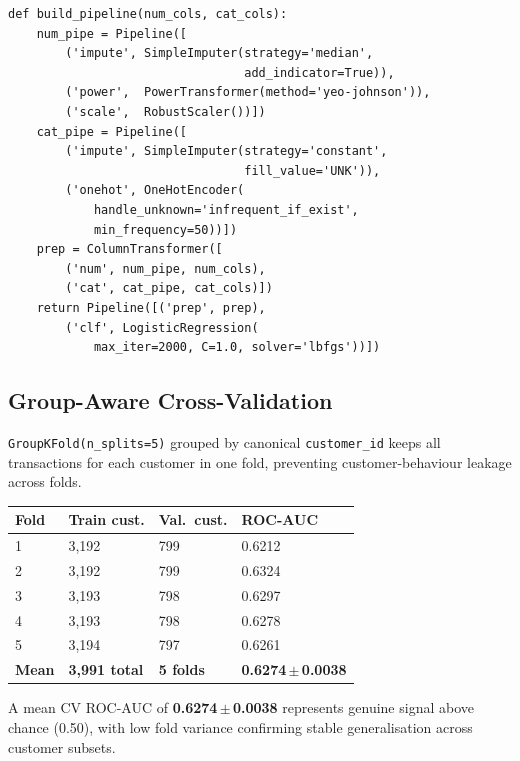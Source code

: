 \documentclass[10pt,a4paper]{article}
\begin{document}
\begin{lstlisting}[caption={End-to-end pipeline.}]
def build_pipeline(num_cols, cat_cols):
    num_pipe = Pipeline([
        ('impute', SimpleImputer(strategy='median',
                                 add_indicator=True)),
        ('power',  PowerTransformer(method='yeo-johnson')),
        ('scale',  RobustScaler())])
    cat_pipe = Pipeline([
        ('impute', SimpleImputer(strategy='constant',
                                 fill_value='UNK')),
        ('onehot', OneHotEncoder(
            handle_unknown='infrequent_if_exist',
            min_frequency=50))])
    prep = ColumnTransformer([
        ('num', num_pipe, num_cols),
        ('cat', cat_pipe, cat_cols)])
    return Pipeline([('prep', prep),
        ('clf', LogisticRegression(
            max_iter=2000, C=1.0, solver='lbfgs'))])
\end{lstlisting}

\subsection*{Group-Aware Cross-Validation}

\texttt{GroupKFold(n\_splits=5)} grouped by canonical
\texttt{customer\_id} keeps all transactions for each customer in
one fold, preventing customer-behaviour leakage across folds.

\vspace{2pt}
{\fontsize{7.5}{9}\selectfont
\setlength{\tabcolsep}{3pt}
\begin{tabularx}{0.6\textwidth}{@{}C{1.0cm} C{3.0cm} C{3.0cm} C{2.5cm}@{}}
\toprule
\textbf{Fold} & \textbf{Train cust.} & \textbf{Val.\ cust.} &
\textbf{ROC-AUC} \\
 & 3,192 & 799 & 0.6212 \\
2 & 3,192 & 799 & 0.6324 \\
3 & 3,193 & 798 & 0.6297 \\
4 & 3,193 & 798 & 0.6278 \\
5 & 3,194 & 797 & 0.6261 \\
\midrule
\textbf{Mean} & \textbf{3,991 total} & \textbf{5 folds} &
  \textbf{0.6274\,$\pm$\,0.0038} \\
\bottomrule
\end{tabularx}
}

\vspace{3pt}
A mean CV ROC-AUC of \textbf{0.6274\,$\pm$\,0.0038} represents genuine
signal above chance (0.50), with low fold variance confirming stable
generalisation across customer subsets.
\end{document}
